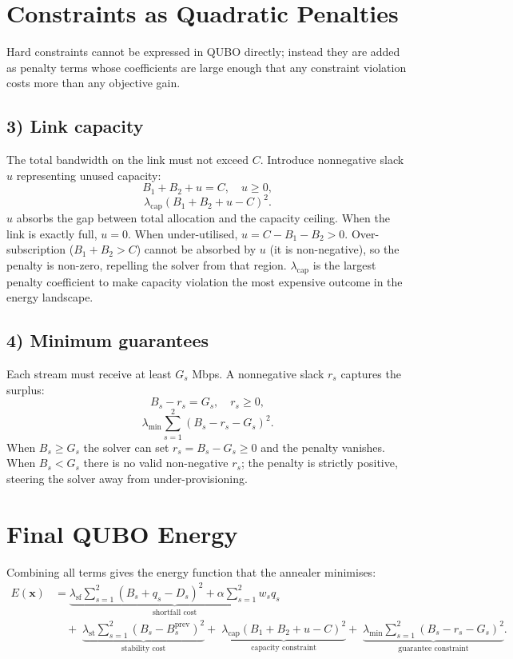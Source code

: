 \documentclass[11pt,a4paper]{article}
\begin{document}
\section*{Constraints as Quadratic Penalties}

Hard constraints cannot be expressed in QUBO directly; instead they are added
as penalty terms whose coefficients are large enough that any constraint
violation costs more than any objective gain.

\subsection*{3) Link capacity}

The total bandwidth on the link must not exceed $C$.  Introduce nonnegative
slack $u$ representing unused capacity:
\[
B_1 + B_2 + u = C,\quad u\ge 0,
\]
\[
\lambda_{\text{cap}}(B_1 + B_2 + u - C)^2.
\]
$u$ absorbs the gap between total allocation and the capacity ceiling.  When the
link is exactly full, $u=0$.  When under-utilised, $u=C - B_1 - B_2 > 0$.
Over-subscription ($B_1+B_2>C$) cannot be absorbed by $u$ (it is non-negative),
so the penalty is non-zero, repelling the solver from that region.
$\lambda_{\text{cap}}$ is the largest penalty coefficient to make capacity
violation the most expensive outcome in the energy landscape.

\subsection*{4) Minimum guarantees}

Each stream must receive at least $G_s$ Mbps.  A nonnegative slack $r_s$
captures the surplus:
\[
B_s - r_s = G_s,\quad r_s\ge 0,
\]
\[
\lambda_{\text{min}}\sum_{s=1}^2 (B_s - r_s - G_s)^2.
\]
When $B_s \ge G_s$ the solver can set $r_s = B_s - G_s \ge 0$ and the penalty
vanishes.  When $B_s < G_s$ there is no valid non-negative $r_s$; the penalty
is strictly positive, steering the solver away from under-provisioning.

\section*{Final QUBO Energy}

Combining all terms gives the energy function that the annealer minimises:
\begin{align*}
E(\mathbf{x}) &=
\underbrace{\lambda_{\text{sf}}\sum_{s=1}^2 (B_s + q_s - D_s)^2
+ \alpha\sum_{s=1}^2 w_s q_s}_{\text{shortfall cost}} \\[6pt]
&\quad+\;\underbrace{\lambda_{\text{st}}\sum_{s=1}^2 (B_s - B_s^{\text{prev}})^2}_{\text{stability cost}}
+\;\underbrace{\lambda_{\text{cap}}(B_1 + B_2 + u - C)^2}_{\text{capacity constraint}}
+\;\underbrace{\lambda_{\text{min}}\sum_{s=1}^2 (B_s - r_s - G_s)^2}_{\text{guarantee constraint}}.
\end{align*}
\end{document}
